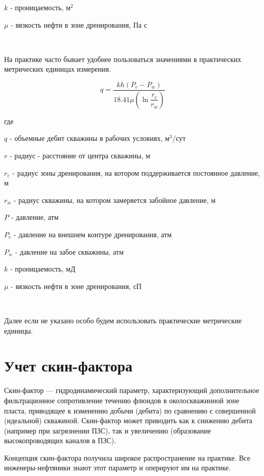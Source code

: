 $k$ - проницаемость, м$^2$

$\mu$ - вязкость нефти в зоне дренирования, Па с

\

На практике часто бывает удобнее пользоваться значениями в практических метрических единицах измерения. 

\begin{equation} \label{eq:dupui_2}
q=\frac{kh\left(P_e-P_w\right)}{ 18.41 \mu\left(\ln{\dfrac{r_e}{r_w}}\right)}
\end{equation}

где 

$q$ - объемные дебит скважины в рабочих условиях, м$^3$/сут

$r$ -  радиус - расстояние от центра скважины, м

$r_e$ -  радиус зоны дренирования, на котором поддерживается постоянное давление, м

$r_w$ - радиус скважины, на котором замеряется забойное давление, м

$P$ - давление, атм

$P_e$ - давление на внешнем контуре дренирования, атм

$P_w$ - давление на забое скважины, атм

$k$ - проницаемость, мД

$\mu$ - вязкость нефти в зоне дренирования, сП

\

Далее если не указано особо будем использовать практические метрические единицы.

\section{Учет скин-фактора}

Скин-фактор — гидродинамический параметр, характеризующий дополнительное фильтрационное сопротивление течению флюидов в околоскважинной зоне пласта, приводящее к изменению добычи (дебита) по сравнению с совершенной (идеальной) скважиной. Скин-фактор может приводить как к снижению дебита (например при загрязнении ПЗС), так и увеличению (образование высокопроводящих каналов в ПЗС).

Концепция скин-фактора получила широкое распространение на практике. Все инженеры-нефтяники знают этот параметр и оперируют им на практике. 

